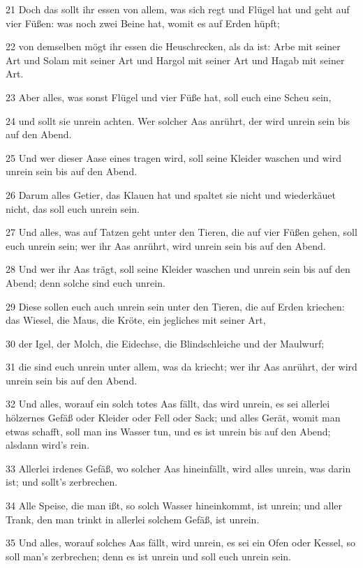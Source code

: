 \par 21 Doch das sollt ihr essen von allem, was sich regt und Flügel hat und geht auf vier Füßen: was noch zwei Beine hat, womit es auf Erden hüpft;
\par 22 von demselben mögt ihr essen die Heuschrecken, als da ist: Arbe mit seiner Art und Solam mit seiner Art und Hargol mit seiner Art und Hagab mit seiner Art.
\par 23 Aber alles, was sonst Flügel und vier Füße hat, soll euch eine Scheu sein,
\par 24 und sollt sie unrein achten. Wer solcher Aas anrührt, der wird unrein sein bis auf den Abend.
\par 25 Und wer dieser Aase eines tragen wird, soll seine Kleider waschen und wird unrein sein bis auf den Abend.
\par 26 Darum alles Getier, das Klauen hat und spaltet sie nicht und wiederkäuet nicht, das soll euch unrein sein.
\par 27 Und alles, was auf Tatzen geht unter den Tieren, die auf vier Füßen gehen, soll euch unrein sein; wer ihr Aas anrührt, wird unrein sein bis auf den Abend.
\par 28 Und wer ihr Aas trägt, soll seine Kleider waschen und unrein sein bis auf den Abend; denn solche sind euch unrein.
\par 29 Diese sollen euch auch unrein sein unter den Tieren, die auf Erden kriechen: das Wiesel, die Maus, die Kröte, ein jegliches mit seiner Art,
\par 30 der Igel, der Molch, die Eidechse, die Blindschleiche und der Maulwurf;
\par 31 die sind euch unrein unter allem, was da kriecht; wer ihr Aas anrührt, der wird unrein sein bis auf den Abend.
\par 32 Und alles, worauf ein solch totes Aas fällt, das wird unrein, es sei allerlei hölzernes Gefäß oder Kleider oder Fell oder Sack; und alles Gerät, womit man etwas schafft, soll man ins Wasser tun, und es ist unrein bis auf den Abend; alsdann wird's rein.
\par 33 Allerlei irdenes Gefäß, wo solcher Aas hineinfällt, wird alles unrein, was darin ist; und sollt's zerbrechen.
\par 34 Alle Speise, die man ißt, so solch Wasser hineinkommt, ist unrein; und aller Trank, den man trinkt in allerlei solchem Gefäß, ist unrein.
\par 35 Und alles, worauf solches Aas fällt, wird unrein, es sei ein Ofen oder Kessel, so soll man's zerbrechen; denn es ist unrein und soll euch unrein sein.
